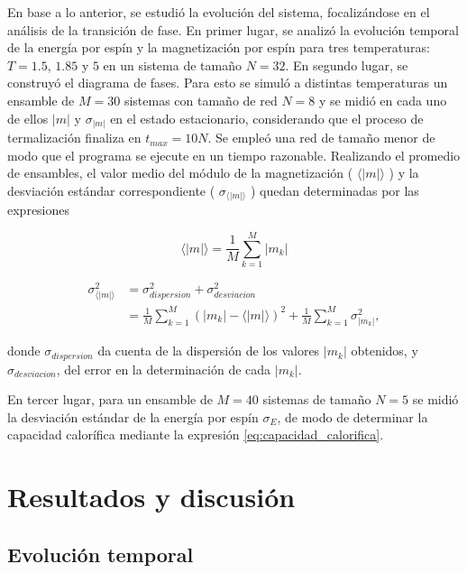 \documentclass[aps,prb,twocolumn,superscriptaddress,floatfix,longbibliography]{revtex4-2}
\newcounter{para}
\begin{document}
En base a lo anterior, se estudió la evolución del sistema, focalizándose en el análisis de la transición de fase. En primer lugar, se analizó la evolución temporal de la energía por espín y la magnetización por espín para tres temperaturas: $T = 1.5$, $1.85$ y $5$ en un sistema de tamaño $N = 32$. En segundo lugar, se construyó el diagrama de fases. Para esto se simuló a distintas temperaturas un ensamble de $M = 30$ sistemas con tamaño de red $N = 8$ y se midió en cada uno de ellos $|m|$ y $\sigma_{|m|}$ en el estado estacionario, considerando que el proceso de termalización finaliza en $t_{max} = 10 N$. Se empleó una red de tamaño menor de modo que el programa se ejecute en un tiempo razonable. Realizando el promedio de ensambles, el valor medio del módulo de la magnetización ( $\langle |m| \rangle$ ) y la desviación estándar correspondiente ( $\sigma_{\langle |m| \rangle}$ ) quedan determinadas por las expresiones

\begin{equation}
\langle |m| \rangle = \frac{1}{M} \sum_{k = 1}^{M} |m_k|
\label{eq:ensamble_m}
\end{equation}

\begin{equation}
\begin{split}
\sigma^2_{\langle |m| \rangle} & = \sigma_{dispersion}^2 + \sigma_{desviacion}^2 \\
& = \frac{1}{M} \sum_{k=1}^M (|m_k| - \langle |m| \rangle)^2 + \frac{1}{M} \sum_{k=1}^M \sigma_{|m_k|}^2,
\end{split}
\label{eq:ensamble_sigma_m}
\end{equation}

donde $\sigma_{dispersion}$ da cuenta de la dispersión de los valores $|m_{k}|$ obtenidos, y $\sigma_{desviacion}$, del error en la determinación de cada $|m_{k}|$.

En tercer lugar, para un ensamble de $M = 40$ sistemas de tamaño $N = 5$ se midió la desviación estándar de la energía por espín $\sigma_E$, de modo de determinar la capacidad calorífica mediante la expresión \ref{eq:capacidad_calorifica}.


\section{Resultados y discusión}

\subsection{Evolución temporal}
\end{document}
